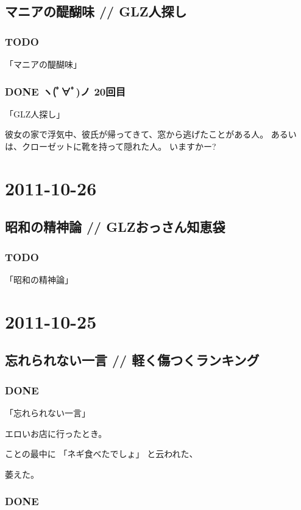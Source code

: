\documentclass[11pt]{article}
\begin{document}
\subsection{マニアの醍醐味 // GLZ人探し}
\label{sec-49_1}
\subsubsection{\textbf{TODO}}
\label{sec-49_1_1}

「マニアの醍醐味」
\subsubsection{\textbf{DONE} ヽ(ﾟ∀ﾟ)ノ 20回目}
\label{sec-49_1_2}

「GLZ人探し」

彼女の家で浮気中、彼氏が帰ってきて、窓から逃げたことがある人。
あるいは、クローゼットに靴を持って隠れた人。
いますかー?
\section{2011-10-26}
\label{sec-50}
\subsection{昭和の精神論 // GLZおっさん知恵袋}
\label{sec-50_1}
\subsubsection{\textbf{TODO}}
\label{sec-50_1_1}

「昭和の精神論」
\section{2011-10-25}
\label{sec-51}
\subsection{忘れられない一言 // 軽く傷つくランキング}
\label{sec-51_1}
\subsubsection{\textbf{DONE}}
\label{sec-51_1_1}

「忘れられない一言」

エロいお店に行ったとき。

ことの最中に
「ネギ食べたでしょ」
と云われた、

萎えた。
\subsubsection{\textbf{DONE}}
\label{sec-51_1_2}
\end{document}
